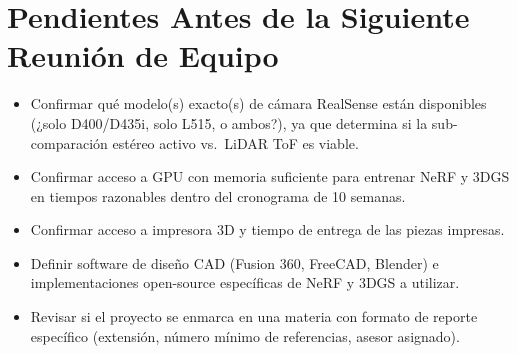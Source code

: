 \documentclass[11pt]{article}
\begin{document}
\section{Pendientes Antes de la Siguiente Reuni\'on de Equipo}

\begin{itemize}
    \item Confirmar qu\'e modelo(s) exacto(s) de c\'amara RealSense est\'an disponibles (¿solo D400/D435i, solo L515, o ambos?), ya que determina si la sub-comparaci\'on est\'ereo activo vs.\ LiDAR ToF es viable.
    \item Confirmar acceso a GPU con memoria suficiente para entrenar NeRF y 3DGS en tiempos razonables dentro del cronograma de 10 semanas.
    \item Confirmar acceso a impresora 3D y tiempo de entrega de las piezas impresas.
    \item Definir software de dise\~no CAD (Fusion 360, FreeCAD, Blender) e implementaciones open-source espec\'ificas de NeRF y 3DGS a utilizar.
    \item Revisar si el proyecto se enmarca en una materia con formato de reporte espec\'ifico (extensi\'on, n\'umero m\'inimo de referencias, asesor asignado).
\end{itemize}
\end{document}

